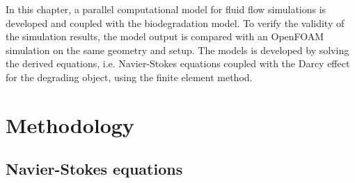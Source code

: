 In this chapter, a parallel computational model for fluid flow simulations is developed and coupled with the biodegradation model. To verify the validity of the simulation results, the model output is compared with an OpenFOAM simulation on the same geometry and setup. The models is developed by solving the derived equations, i.e. Navier-Stokes equations coupled with the Darcy effect for the degrading object, using the finite element method.

\section{Methodology}

\subsection{Navier-Stokes equations}

